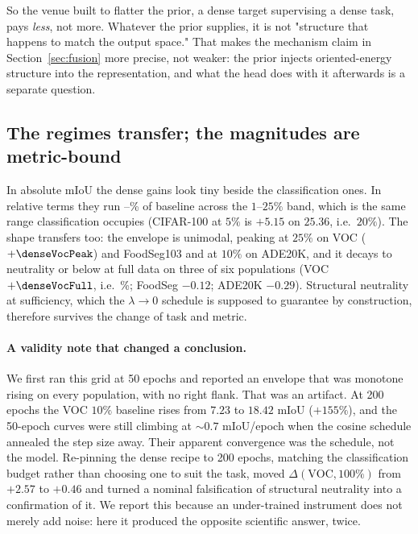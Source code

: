 So the venue built to flatter the prior, a dense target supervising a dense
task, pays \emph{less}, not more. Whatever the prior supplies, it is
not "structure that happens to match the output space." That makes the
mechanism claim in Section~\ref{sec:fusion} more precise, not weaker: the
prior injects oriented-energy structure into the representation, and what the
head does with it afterwards is a separate question.

\subsection{The regimes transfer; the magnitudes are metric-bound}
In absolute mIoU the dense gains look tiny beside the classification ones. In
relative terms they run \denseRelLo--\denseRelHi\% of baseline across the
$1$--$25\%$ band, which is the same range classification occupies
(CIFAR-100 at $5\%$ is $+5.15$ on $25.36$, i.e.\ $20\%$). The shape transfers
too: the envelope is unimodal, peaking at $25\%$ on VOC
($+\denseVocPeak$) and FoodSeg103 and at $10\%$ on ADE20K, and it decays to
neutrality or below at full data on three of six populations
(VOC $+\denseVocFull$, i.e.\ \denseVocFullRel\%; FoodSeg $-0.12$;
ADE20K $-0.29$). Structural neutrality at sufficiency, which the
$\lambda \to 0$ schedule is supposed to guarantee by construction, therefore
 survives the change of task and metric.

\paragraph{A validity note that changed a conclusion.} We first ran this grid
at 50 epochs and reported an envelope that was monotone rising on every
population, with no right flank. That was an artifact. At 200 epochs the VOC
$10\%$ baseline rises from $7.23$ to $18.42$ mIoU ($+155\%$), and the
50-epoch curves were still climbing at ${\sim}0.7$ mIoU/epoch when the cosine
schedule annealed the step size away. Their apparent convergence was the
schedule, not the model. Re-pinning the dense recipe to 200 epochs, matching
the classification budget rather than choosing one to suit the task, moved
$\Delta(\mathrm{VOC},100\%)$ from $+2.57$ to $+0.46$ and turned a nominal
falsification of structural neutrality into a confirmation of it. We report
this because an under-trained instrument does not merely add noise: here it
produced the opposite scientific answer, twice.

